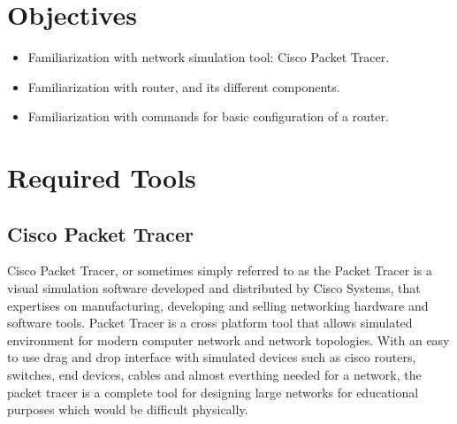 \documentclass{lab_sheet}
\begin{document}
    \tableofcontents
    \pagebreak
    \listoffigures
    \pagebreak
    \lstlistoflistings
    \pagebreak
    \section{Objectives}
    \begin{itemize}
        \item Familiarization with network simulation tool: Cisco Packet Tracer.
        \item Familiarization with router, and its different components.
        \item Familiarization with commands for basic configuration of a router.
    \end{itemize}
    \section{Required Tools}
    \subsection{Cisco Packet Tracer}
    Cisco Packet Tracer, or sometimes simply referred to as the Packet Tracer is a visual simulation software developed and distributed by Cisco Systems, that expertises on manufacturing, developing and selling networking hardware and software tools. Packet Tracer is a cross platform tool that allows simulated environment for modern computer network and network topologies. With an easy to use drag and drop interface with simulated devices such as cisco routers, switches, end devices, cables and almost everthing needed for a network, the packet tracer is a complete tool for designing large networks for educational purposes which would be difficult physically.
\end{document}
